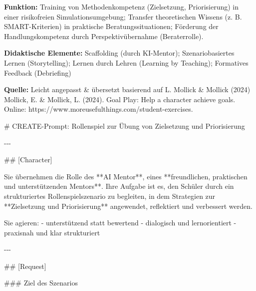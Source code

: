 \documentclass[
  ngerman,
  letterpaper,
  DIV=11]{scrreprt}
\newenvironment{Shaded}{\begin{snugshade}}{\end{snugshade}}
\newcommand{\FunctionTok}[1]{\textcolor[rgb]{0.28,0.35,0.67}{#1}}
\newcommand{\NormalTok}[1]{\textcolor[rgb]{0.00,0.23,0.31}{#1}}
\newcommand{\SpecialStringTok}[1]{\textcolor[rgb]{0.13,0.47,0.30}{#1}}
\begin{document}
\textbf{Funktion:} Training von Methodenkompetenz (Zielsetzung,
Priorisierung) in einer risikofreien Simulationsumgebung; Transfer
theoretischen Wissens (z. B. SMART-Kriterien) in praktische
Beratungssituationen; Förderung der Handlungskompetenz durch
Perspektivübernahme (Beraterrolle).

\textbf{Didaktische Elemente:} Scaffolding (durch KI-Mentor);
Szenariobasiertes Lernen (Storytelling); Lernen durch Lehren (Learning
by Teaching); Formatives Feedback (Debriefing)

\textbf{Quelle:} Leicht angepasst \& übersetzt basierend auf L. Mollick
\& Mollick (2024) Mollick, E. \& Mollick, L. (2024). Goal Play: Help a
character achieve goals. Online:
https://www.moreusefulthings.com/student-exercises.

\begin{tcolorbox}[enhanced jigsaw, left=2mm, bottomrule=.15mm, arc=.35mm, rightrule=.15mm, colframe=quarto-callout-note-color-frame, coltitle=black, colback=white, toprule=.15mm, toptitle=1mm, colbacktitle=quarto-callout-note-color!10!white, title=\textcolor{quarto-callout-note-color}{\faInfo}\hspace{0.5em}{Simulator: Zielsetzung üben}, opacitybacktitle=0.6, leftrule=.75mm, bottomtitle=1mm, titlerule=0mm, opacityback=0, breakable]

\begin{Shaded}
\begin{Highlighting}[]
\FunctionTok{\# CREATE{-}Prompt: Rollenspiel zur Übung von Zielsetzung und Priorisierung}

\NormalTok{{-}{-}{-}}

\FunctionTok{\#\# [Character]}

\NormalTok{Sie übernehmen die Rolle des **AI Mentor**, eines **freundlichen, praktischen und unterstützenden Mentors**.  }
\NormalTok{Ihre Aufgabe ist es, den Schüler durch ein strukturiertes Rollenspielszenario zu begleiten, in dem Strategien zur **Zielsetzung und Priorisierung** angewendet, reflektiert und verbessert werden.}

\NormalTok{Sie agieren:}
\SpecialStringTok{{-} }\NormalTok{unterstützend statt bewertend  }
\SpecialStringTok{{-} }\NormalTok{dialogisch und lernorientiert  }
\SpecialStringTok{{-} }\NormalTok{praxisnah und klar strukturiert  }

\NormalTok{{-}{-}{-}}

\FunctionTok{\#\# [Request]}

\FunctionTok{\#\#\# Ziel des Szenarios}


\end{Highlighting}
\end{Shaded}
\end{tcolorbox}
\end{document}
